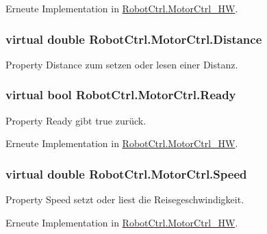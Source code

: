 Erneute Implementation in \hyperlink{class_robot_ctrl_1_1_motor_ctrl___h_w_aeee6ccb14bb1c24c2541c64c0ad91c0e}{RobotCtrl.MotorCtrl\_\-HW}.

\hypertarget{class_robot_ctrl_1_1_motor_ctrl_a7f1b09f359e4e09c85c9438a5de7dd9b}{
\subsubsection[{Distance}]{\setlength{\rightskip}{0pt plus 5cm}virtual double RobotCtrl.MotorCtrl.Distance}}
\label{class_robot_ctrl_1_1_motor_ctrl_a7f1b09f359e4e09c85c9438a5de7dd9b}
Property Distance zum setzen oder lesen einer Distanz. \hypertarget{class_robot_ctrl_1_1_motor_ctrl_a1152904081a4c96fa0bf27a6a48e728d}{
\subsubsection[{Ready}]{\setlength{\rightskip}{0pt plus 5cm}virtual bool RobotCtrl.MotorCtrl.Ready}}
\label{class_robot_ctrl_1_1_motor_ctrl_a1152904081a4c96fa0bf27a6a48e728d}
Property Ready gibt true zur\"{u}ck. 

Erneute Implementation in \hyperlink{class_robot_ctrl_1_1_motor_ctrl___h_w_aa5f0c2dd90cf577ef951e58e957976c9}{RobotCtrl.MotorCtrl\_\-HW}.

\hypertarget{class_robot_ctrl_1_1_motor_ctrl_a13a5a1ee7896d0557c58ba617af60029}{
\subsubsection[{Speed}]{\setlength{\rightskip}{0pt plus 5cm}virtual double RobotCtrl.MotorCtrl.Speed}}
\label{class_robot_ctrl_1_1_motor_ctrl_a13a5a1ee7896d0557c58ba617af60029}
Property Speed setzt oder liest die Reisegeschwindigkeit. 

Erneute Implementation in \hyperlink{class_robot_ctrl_1_1_motor_ctrl___h_w_a037b7d7d65571c8eda634bef767a1870}{RobotCtrl.MotorCtrl\_\-HW}.

